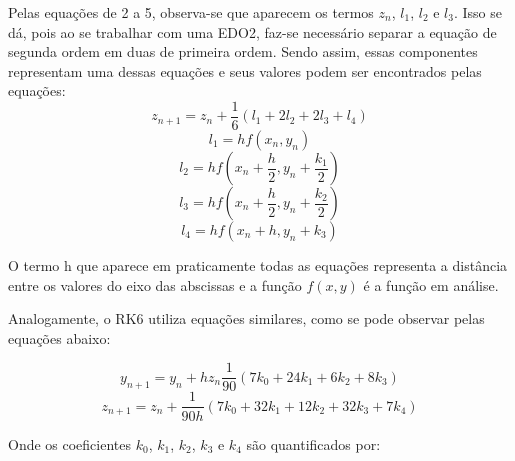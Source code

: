 \documentclass[a4paper,11pt]{article}
\begin{document}
    Pelas equações de 2 a 5, observa-se que aparecem os termos $z_n$, $l_1$, $l_2$ e $l_3$. Isso se dá, pois ao se trabalhar com uma EDO2, faz-se necessário separar a equação de segunda ordem em duas de primeira ordem. Sendo assim, essas componentes representam uma dessas equações e seus valores podem ser encontrados pelas equações:
    \begin{equation}
        \label{zn}
        z_{n+1} = z_n + \frac{1}{6}(l_1+2l_2+2l_3+l_4)
    \end{equation}
        \begin{equation}
        \label{l1}
        l_1=hf(x_n,y_n)
    \end{equation}
    \begin{equation}
        \label{l2}
        l_2=hf\left(x_n+\frac{h}{2},y_n+\frac{k_1}{2}\right)
    \end{equation}
    \begin{equation}
        \label{l3}
        l_3=hf\left(x_n+\frac{h}{2},y_n+\frac{k_2}{2}\right)
    \end{equation}
    \begin{equation}
        \label{l4}
        l_4=hf(x_n+h,y_n+k_3)
    \end{equation}
    
    O termo h que aparece em praticamente todas as equações representa a distância entre os valores do eixo das abscissas e a função $f(x,y)$ é a função em análise.
    
    
    Analogamente, o RK6 utiliza equações similares, como se pode observar pelas equações abaixo:
    
    \begin{equation}
        \label{RK6}
        y_{n+1} = y_n + hz_n \frac{1}{90}(7k_0+24k_1+6k_2+8k_3)
    \end{equation}
    \begin{equation}
        \label{zn6}
        z_{n+1} = z_n + \frac{1}{90h}(7k_0+32k_1+12k_2+32k_3+7k_4)
    \end{equation}
    
    Onde os coeficientes $k_0$, $k_1$, $k_2$, $k_3$ e $k_4$ são quantificados por:
    
\end{document}
